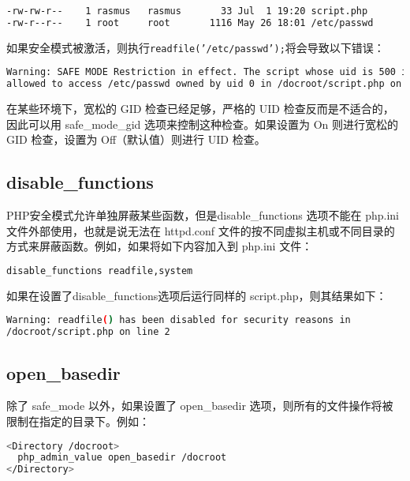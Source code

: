 \begin{lstlisting}[language=bash]
-rw-rw-r--    1 rasmus   rasmus       33 Jul  1 19:20 script.php
-rw-r--r--    1 root     root       1116 May 26 18:01 /etc/passwd
\end{lstlisting}

如果安全模式被激活，则执行\texttt{readfile('/etc/passwd');}将会导致以下错误：


\begin{lstlisting}[language=bash]
Warning: SAFE MODE Restriction in effect. The script whose uid is 500 is not
allowed to access /etc/passwd owned by uid 0 in /docroot/script.php on line 2
\end{lstlisting}

在某些环境下，宽松的 GID 检查已经足够，严格的 UID 检查反而是不适合的，因此可以用 safe\_mode\_gid 选项来控制这种检查。如果设置为 On 则进行宽松的 GID 检查，设置为 Off（默认值）则进行 UID 检查。

\subsection{disable\_functions}

PHP安全模式允许单独屏蔽某些函数，但是disable\_functions 选项不能在 php.ini 文件外部使用，也就是说无法在 httpd.conf 文件的按不同虚拟主机或不同目录的方式来屏蔽函数。例如，如果将如下内容加入到 php.ini 文件：

\begin{lstlisting}[language=bash]
disable_functions readfile,system
\end{lstlisting}


如果在设置了disable\_functions选项后运行同样的 script.php，则其结果如下：


\begin{lstlisting}[language=bash]
Warning: readfile() has been disabled for security reasons in
/docroot/script.php on line 2
\end{lstlisting}

\subsection{open\_basedir}

除了 safe\_mode 以外，如果设置了 open\_basedir 选项，则所有的文件操作将被限制在指定的目录下。例如：


\begin{lstlisting}[language=bash]
<Directory /docroot>
  php_admin_value open_basedir /docroot
</Directory>
\end{lstlisting}


